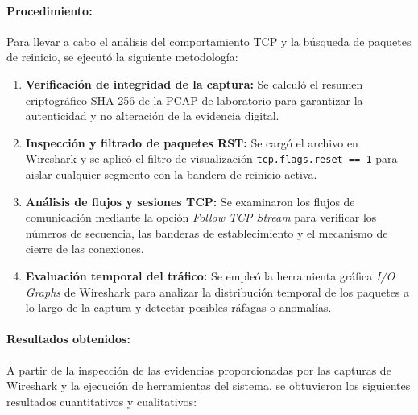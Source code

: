 \paragraph{Procedimiento:} \par
Para llevar a cabo el análisis del comportamiento TCP y la búsqueda de paquetes de reinicio, se ejecutó la siguiente metodología:
\begin{enumerate}
    \item \textbf{Verificación de integridad de la captura:} Se calculó el resumen criptográfico SHA-256 de la PCAP de laboratorio para garantizar la autenticidad y no alteración de la evidencia digital.
    \item \textbf{Inspección y filtrado de paquetes RST:} Se cargó el archivo en Wireshark y se aplicó el filtro de visualización \texttt{tcp.flags.reset == 1} para aislar cualquier segmento con la bandera de reinicio activa.
    \item \textbf{Análisis de flujos y sesiones TCP:} Se examinaron los flujos de comunicación mediante la opción \textit{Follow TCP Stream} para verificar los números de secuencia, las banderas de establecimiento y el mecanismo de cierre de las conexiones.
    \item \textbf{Evaluación temporal del tráfico:} Se empleó la herramienta gráfica \textit{I/O Graphs} de Wireshark para analizar la distribución temporal de los paquetes a lo largo de la captura y detectar posibles ráfagas o anomalías.
\end{enumerate}

\paragraph{Resultados obtenidos:}
A partir de la inspección de las evidencias proporcionadas por las capturas de Wireshark y la ejecución de herramientas del sistema, se obtuvieron los siguientes resultados cuantitativos y cualitativos:

